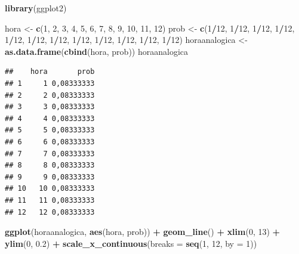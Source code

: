 \documentclass[
]{book}
\newenvironment{Shaded}{\begin{snugshade}}{\end{snugshade}}
\newcommand{\DataTypeTok}[1]{\textcolor[rgb]{0.13,0.29,0.53}{#1}}
\newcommand{\DecValTok}[1]{\textcolor[rgb]{0.00,0.00,0.81}{#1}}
\newcommand{\FloatTok}[1]{\textcolor[rgb]{0.00,0.00,0.81}{#1}}
\newcommand{\KeywordTok}[1]{\textcolor[rgb]{0.13,0.29,0.53}{\textbf{#1}}}
\newcommand{\NormalTok}[1]{#1}
\newcommand{\OperatorTok}[1]{\textcolor[rgb]{0.81,0.36,0.00}{\textbf{#1}}}
\newcommand{\StringTok}[1]{\textcolor[rgb]{0.31,0.60,0.02}{#1}}
\begin{document}
\begin{Shaded}
\begin{Highlighting}[]
\KeywordTok{library}\NormalTok{(ggplot2)}

\NormalTok{hora <-}\StringTok{ }\KeywordTok{c}\NormalTok{(}\DecValTok{1}\NormalTok{, }\DecValTok{2}\NormalTok{, }\DecValTok{3}\NormalTok{, }\DecValTok{4}\NormalTok{, }\DecValTok{5}\NormalTok{, }\DecValTok{6}\NormalTok{, }\DecValTok{7}\NormalTok{, }\DecValTok{8}\NormalTok{, }\DecValTok{9}\NormalTok{, }\DecValTok{10}\NormalTok{, }\DecValTok{11}\NormalTok{, }\DecValTok{12}\NormalTok{)}
\NormalTok{prob <-}\StringTok{ }\KeywordTok{c}\NormalTok{(}\DecValTok{1}\OperatorTok{/}\DecValTok{12}\NormalTok{, }\DecValTok{1}\OperatorTok{/}\DecValTok{12}\NormalTok{, }\DecValTok{1}\OperatorTok{/}\DecValTok{12}\NormalTok{, }\DecValTok{1}\OperatorTok{/}\DecValTok{12}\NormalTok{, }\DecValTok{1}\OperatorTok{/}\DecValTok{12}\NormalTok{, }\DecValTok{1}\OperatorTok{/}\DecValTok{12}\NormalTok{, }\DecValTok{1}\OperatorTok{/}\DecValTok{12}\NormalTok{, }
    \DecValTok{1}\OperatorTok{/}\DecValTok{12}\NormalTok{, }\DecValTok{1}\OperatorTok{/}\DecValTok{12}\NormalTok{, }\DecValTok{1}\OperatorTok{/}\DecValTok{12}\NormalTok{, }\DecValTok{1}\OperatorTok{/}\DecValTok{12}\NormalTok{, }\DecValTok{1}\OperatorTok{/}\DecValTok{12}\NormalTok{)}
\NormalTok{horaanalogica <-}\StringTok{ }\KeywordTok{as.data.frame}\NormalTok{(}\KeywordTok{cbind}\NormalTok{(hora, prob))}
\NormalTok{horaanalogica}
\end{Highlighting}
\end{Shaded}

\begin{verbatim}
##    hora       prob
## 1     1 0,08333333
## 2     2 0,08333333
## 3     3 0,08333333
## 4     4 0,08333333
## 5     5 0,08333333
## 6     6 0,08333333
## 7     7 0,08333333
## 8     8 0,08333333
## 9     9 0,08333333
## 10   10 0,08333333
## 11   11 0,08333333
## 12   12 0,08333333
\end{verbatim}

\begin{Shaded}
\begin{Highlighting}[]
\KeywordTok{ggplot}\NormalTok{(horaanalogica, }\KeywordTok{aes}\NormalTok{(hora, prob)) }\OperatorTok{+}\StringTok{ }\KeywordTok{geom_line}\NormalTok{() }\OperatorTok{+}\StringTok{ }
\StringTok{    }\KeywordTok{xlim}\NormalTok{(}\DecValTok{0}\NormalTok{, }\DecValTok{13}\NormalTok{) }\OperatorTok{+}\StringTok{ }\KeywordTok{ylim}\NormalTok{(}\DecValTok{0}\NormalTok{, }\FloatTok{0.2}\NormalTok{) }\OperatorTok{+}\StringTok{ }\KeywordTok{scale_x_continuous}\NormalTok{(}\DataTypeTok{breaks =} \KeywordTok{seq}\NormalTok{(}\DecValTok{1}\NormalTok{, }
    \DecValTok{12}\NormalTok{, }\DataTypeTok{by =} \DecValTok{1}\NormalTok{))}
\end{Highlighting}
\end{Shaded}
\end{document}

